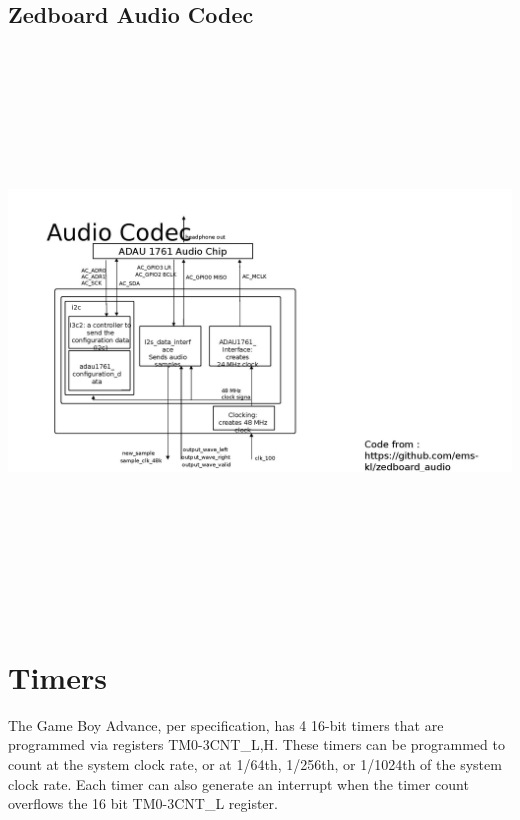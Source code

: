 \documentclass[11pt,a4paper,draft]{article}
\begin{document}
	\subsection{Zedboard Audio Codec}
	\includegraphics[width=14cm, height=15cm, keepaspectratio=true]{codec}
	
	\section{Timers}
	The Game Boy Advance, per specification, has 4 16-bit timers that are programmed via registers TM{0-3}CNT\_{L,H}. These timers can be programmed to count at the system clock rate, or at 1/64th, 1/256th, or 1/1024th of the system clock rate. Each timer can also generate an interrupt when the timer count overflows the 16 bit TM{0-3}CNT\_L register.\\
	
\end{document}
